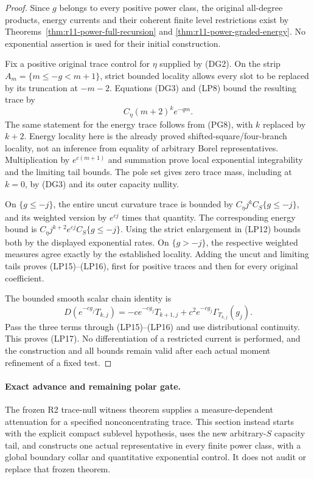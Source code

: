 \begin{proof}
Since $g$ belongs to every positive power class, the original
all-degree products, energy currents and their coherent finite
level restrictions exist by
Theorems~\ref{thm:r11-power-full-recursion} and
\ref{thm:r11-power-graded-energy}. No exponential assertion
is used for their initial construction.

Fix a positive original trace control for $\eta$ supplied by
(DG2). On the strip $A_m=\{m\leq-g<m+1\}$, strict
bounded locality allows every slot to be replaced by its
truncation at $-m-2$. Equations (DG3) and (LP8) bound the
resulting trace by
\[
                         C_\eta(m+2)^k e^{-qm}.
\]
The same statement for the energy trace follows from (PG8),
with $k$ replaced by $k+2$. Energy locality here is the
already proved shifted-square/four-branch locality, not an
inference from equality of arbitrary Borel representatives.
Multiplication by $e^{c(m+1)}$ and summation prove local
exponential integrability and the limiting tail bounds.
The pole set gives zero trace mass, including at $k=0$,
by (DG3) and its outer capacity nullity.

On $\{g\leq-j\}$, the entire uncut curvature trace is
bounded by $C_\eta j^k C_S\{g\leq-j\}$, and its weighted
version by $e^{cj}$ times that quantity. The corresponding
energy bound is $C_\eta j^{k+2}e^{cj}C_S\{g\leq-j\}$.
Using the strict enlargement in (LP12) bounds both by the
displayed exponential rates. On $\{g>-j\}$, the respective
weighted measures agree exactly by the established locality.
Adding the uncut and limiting tails proves (LP15)--(LP16),
first for positive traces and then for every original coefficient.

The bounded smooth scalar chain identity is
\[
 D(e^{-cg_j}T_{k,j})
     =-c e^{-cg_j}T_{k+1,j}
                  +c^2e^{-cg_j}\Gamma_{T_{k,j}}(g_j).
\]
Pass the three terms through (LP15)--(LP16) and use
distributional continuity. This proves (LP17).
No differentiation of a restricted current is performed,
and the construction and all bounds remain valid after
each actual moment refinement of a fixed test.
\end{proof}

\paragraph{Exact advance and remaining polar gate.}
The frozen R2 trace-null witness theorem supplies a
measure-dependent attenuation for a specified nonconcentrating
trace. This section instead starts with the explicit compact
sublevel hypothesis, uses the new arbitrary-$S$ capacity tail,
and constructs one actual representative in every finite power
class, with a global boundary collar and quantitative exponential
control. It does not audit or replace that frozen theorem.

